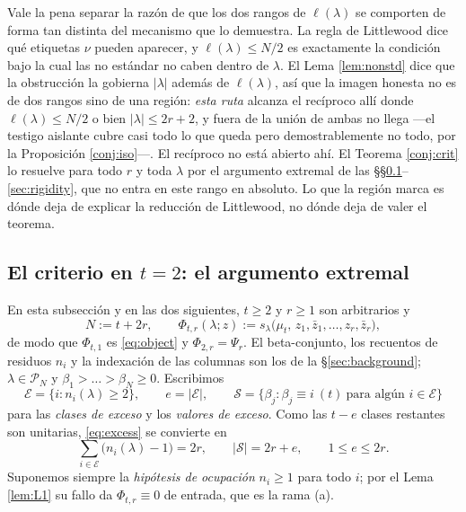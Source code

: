 \documentclass[11pt,reqno]{amsart}
\theoremstyle{plain}
\theoremstyle{definition}
\newcommand{\PP}{\mathcal{P}}
\newcommand{\zt}{\mu_t}
\newcommand{\zb}{\bar z}
\begin{document}
Vale la pena separar la razón de que los dos rangos de $\ell(\lambda)$ se comporten de forma tan
distinta del mecanismo que lo demuestra. La regla de Littlewood dice qué etiquetas $\nu$ pueden
aparecer, y $\ell(\lambda)\le N/2$ es exactamente la condición bajo la cual las no estándar no caben
dentro de $\lambda$. El Lema \ref{lem:nonstd} dice que la obstrucción la gobierna $|\lambda|$ además
de $\ell(\lambda)$, así que la imagen honesta no es de dos rangos sino de una región: \emph{esta
ruta} alcanza el recíproco allí donde $\ell(\lambda)\le N/2$ o bien $|\lambda|\le2r+2$, y fuera de la
unión de ambas no llega ---el testigo aislante cubre casi todo lo que queda pero demostrablemente no
todo, por la Proposición \ref{conj:iso}---. El recíproco no está abierto ahí. El Teorema
\ref{conj:crit} lo resuelve para todo $r$ y toda $\lambda$ por el argumento extremal de las
\S\S\ref{sec:extremal}--\ref{sec:rigidity}, que no entra en este rango en absoluto. Lo que la región
marca es dónde deja de explicar la reducción de Littlewood, no dónde deja de valer el teorema.

\subsection{El criterio en \texorpdfstring{$t=2$}{t=2}: el argumento extremal}\label{sec:extremal}

En esta subsección y en las dos siguientes, $t\ge2$ y $r\ge1$ son arbitrarios y
\[
  N:=t+2r,\qquad
  \Phi_{t,r}(\lambda;z):=s_\lambda\bigl(\zt,\,z_1,\zb_1,\dots,z_r,\zb_r\bigr),
\]
de modo que $\Phi_{t,1}$ es \eqref{eq:object} y $\Phi_{2,r}=\Psi_r$. El beta-conjunto, los recuentos
de residuos $n_i$ y la indexación de las columnas son los de la \S\ref{sec:background}; $\lambda\in\PP_N$ y
$\beta_1>\dots>\beta_N\ge0$. Escribimos
\[
  \mathcal{E}=\{i:n_i(\lambda)\ge2\},\qquad e=|\mathcal{E}|,\qquad
  \mathcal{S}=\{\beta_j:\beta_j\equiv i\ (t)\ \text{para algún } i\in\mathcal{E}\}
\]
para las \emph{clases de exceso} y los \emph{valores de exceso}. Como las $t-e$ clases restantes son
unitarias, \eqref{eq:excess} se convierte en
\begin{equation}\label{eq:excessgen}
  \sum_{i\in\mathcal{E}}\bigl(n_i(\lambda)-1\bigr)=2r,\qquad |\mathcal{S}|=2r+e,\qquad 1\le e\le2r .
\end{equation}
Suponemos siempre la \emph{hipótesis de ocupación} $n_i\ge1$ para todo $i$; por el Lema
\ref{lem:L1} su fallo da $\Phi_{t,r}\equiv0$ de entrada, que es la rama (a).
\end{document}
